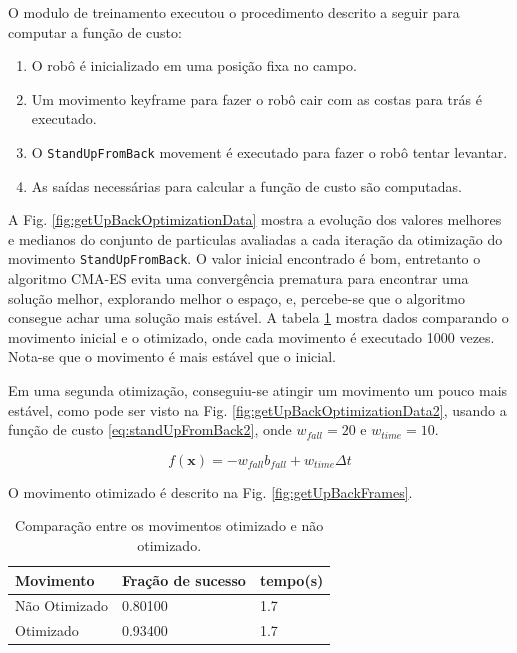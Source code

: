 \documentclass[
10pt, %
a4paper, %
oneside, %
headinclude,footinclude, %
BCOR5mm, %
]{scrartcl}
\newcommand*{\inlinecode}{\texttt}%
\begin{document}
O modulo de treinamento executou o procedimento descrito a seguir para computar a função de custo:
\begin{enumerate}
\item O robô é inicializado em uma posição fixa no campo.
\item Um movimento keyframe para fazer o robô cair com as costas para trás é executado.
\item O \inlinecode{StandUpFromBack} movement é executado para fazer o robô tentar levantar.
\item As saídas necessárias para calcular a função de custo são computadas.
\end{enumerate}

A Fig. \ref{fig:getUpBackOptimizationData} mostra a evolução dos valores melhores e medianos do conjunto de particulas avaliadas a cada iteração da otimização do movimento \inlinecode{StandUpFromBack}. O valor inicial encontrado é bom, entretanto o algoritmo CMA-ES evita uma convergência prematura para encontrar uma solução melhor, explorando melhor o espaço, e, percebe-se que o algoritmo consegue achar uma solução mais estável. A tabela \ref{tab:getUpBackTable} mostra dados comparando o movimento inicial e o otimizado, onde cada movimento é executado 1000 vezes. Nota-se que o movimento é mais estável que o inicial.

Em uma segunda otimização, conseguiu-se atingir um movimento um pouco mais estável, como pode ser visto na Fig. \ref{fig:getUpBackOptimizationData2}, usando a função de custo \eqref{eq:standUpFromBack2}, onde $w_{fall} = 20$ e $w_{time} = 10$.

\begin{equation} \label{eq:standUpFromBack2}
f \left( \mathrm{\mathbf{x}} \right) = -w_{fall} b_{fall} + w_{time} \Delta t
\end{equation}

 O movimento otimizado é descrito na Fig. \ref{fig:getUpBackFrames}.

\begin{table}
\centering
\caption{Comparação entre os movimentos otimizado e não otimizado.}
\label{tab:getUpBackTable}
\begin{tabular}{|l|l|l|}
\hline
Movimento      & Fração de sucesso & tempo(s)  \\ \hline
Não Otimizado & 0.80100  & 1.7  \\ \hline
Otimizado    & 0.93400  & 1.7  \\ \hline
\end{tabular}
\end{table}
\end{document}
